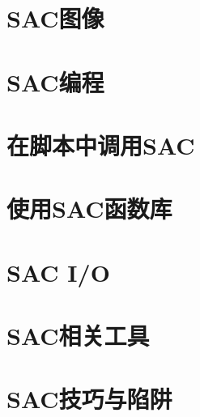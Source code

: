 \chapter{SAC图像}
\label{chap:sac-graphics}









\chapter{SAC编程}
\label{chap:sac-programming}






\chapter{在脚本中调用SAC}
\label{chap:sac-script}





\chapter{使用SAC函数库}
\label{chap:sac-libs}





\chapter{SAC I/O}
\label{chap:sac-io}






\chapter{SAC相关工具}






\chapter{SAC技巧与陷阱}









